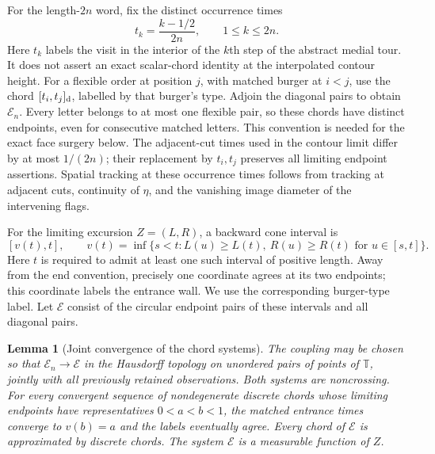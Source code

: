 \documentclass[11pt]{article}
\numberwithin{equation}{section}
\newtheorem{lemma}[theorem]{Lemma}
\theoremstyle{definition}
\theoremstyle{remark}
\newcommand{\1}{\mathbf 1}
\begin{document}
For the length-$2n$ word, fix the distinct occurrence times
\[
 t_k=\frac{k-1/2}{2n},\qquad 1\le k\le2n.
\]
Here $t_k$ labels the visit in the interior of the $k$th step of the
abstract medial tour.  It does not assert an exact scalar-chord identity
at the interpolated contour height.  For a flexible order at position
$j$, with matched burger at $i<j$, use the chord $[t_i,t_j]_{\rm d}$,
labelled by that burger's type.  Adjoin the diagonal pairs to obtain
$\mathcal E_n$.  Every letter belongs to at most one flexible pair,
so these chords have distinct endpoints, even for consecutive matched
letters.  This convention is needed for the exact face surgery below.
The adjacent-cut times used in the contour limit differ by at most
$1/(2n)$; their replacement by $t_i,t_j$ preserves all limiting
endpoint assertions.  Spatial tracking at these occurrence times
follows from tracking at adjacent cuts, continuity of $\eta$, and
the vanishing image diameter of the intervening flags.

For the limiting excursion $Z=(L,R)$, a backward cone interval is
\[
 [v(t),t],\qquad
 v(t)=\inf\{s<t:L(u)\ge L(t),\ R(u)\ge R(t)
                         \text{ for }u\in[s,t]\}.
\]
Here $t$ is required to admit at least one such interval of positive
length.  Away from the end convention, precisely one coordinate agrees
at its two endpoints; this coordinate labels the entrance wall.  We use
the corresponding burger-type label.  Let $\mathcal E$ consist of the
circular endpoint pairs of these intervals and all diagonal pairs.

\begin{lemma}[Joint convergence of the chord systems]\label{loop:chords}
The coupling may be chosen so that $\mathcal E_n\to\mathcal E$ in the
Hausdorff topology on unordered pairs of points of $\mathbb T$, jointly
with all previously retained observations.  Both systems are noncrossing.
For every convergent sequence of nondegenerate discrete chords whose
limiting endpoints have representatives $0<a<b<1$, the matched entrance
times converge to $v(b)=a$ and the labels eventually agree.  Every chord
of $\mathcal E$ is approximated by discrete chords.  The system
$\mathcal E$ is a measurable function of $Z$.
\end{lemma}
\end{document}
